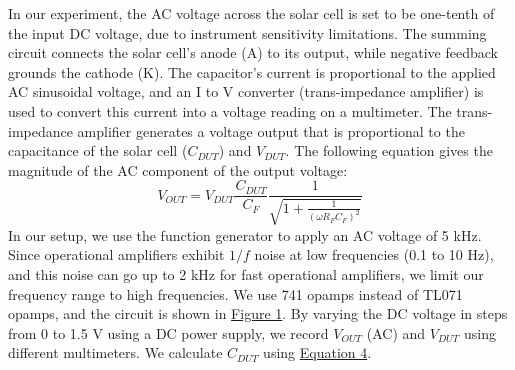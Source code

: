 In our experiment, the AC voltage across the solar cell is set to be one-tenth of the input DC voltage, due to instrument sensitivity limitations. The summing circuit connects the solar cell's anode (A) to its output, while negative feedback grounds the cathode (K). The capacitor's current is proportional to the applied AC sinusoidal voltage, and an I to V converter (trans-impedance amplifier) is used to convert this current into a voltage reading on a multimeter. The trans-impedance amplifier generates a voltage output that is proportional to the capacitance of the solar cell ($C_{DUT}$) and $V_{DUT}$. The following equation gives the magnitude of the AC component of the output voltage: 
\begin{equation}
    V_{OUT}=V_{DUT}\frac{C_{DUT}}{C_F}\frac{1}{\sqrt{1+\frac{1}{(\omega R_F C_F)^2}}}
    \label{eq:5}
\end{equation}
In our setup, we use the function generator to apply an AC voltage of 5 kHz. Since operational amplifiers exhibit $1/f$ noise at low frequencies (0.1 to 10 Hz), and this noise can go up to 2 kHz for fast operational amplifiers, we limit our frequency range to high frequencies. We use 741 opamps instead of TL071 opamps, and the circuit is shown in \hyperref[th:1]{Figure 1}. By varying the DC voltage in steps from 0 to 1.5 V using a DC power supply, we record $V_{OUT}$ (AC) and $V_{DUT}$ using different multimeters. We calculate $C_{DUT}$ using \hyperref[eq:4]{Equation 4}.